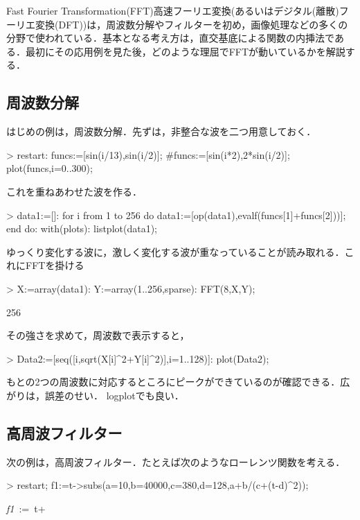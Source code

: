 Fast Fourier Transformation(FFT)高速フーリエ変換(あるいはデジタル(離散)フーリエ変換(DFT))は，周波数分解やフィルターを初め，画像処理などの多くの分野で使われている．基本となる考え方は，直交基底による関数の内挿法である．最初にその応用例を見た後，どのような理屈でFFTが動いているかを解説する．

\subsection{周波数分解}
はじめの例は，周波数分解．先ずは，非整合な波を二つ用意しておく．
\begin{MapleInput}
> restart:
  funcs:=[sin(i/13),sin(i/2)];
  #funcs:=[sin(i*2),2*sin(i/2)];
  plot(funcs,i=0..300);
\end{MapleInput}
これを重ねあわせた波を作る．
\begin{MapleInput}
> data1:=[]:
  for i from 1 to 256 do
    data1:=[op(data1),evalf(funcs[1]+funcs[2]))]; 
  end do:
  with(plots): 
  listplot(data1);
\end{MapleInput}
ゆっくり変化する波に，激しく変化する波が重なっていることが読み取れる．これにFFTを掛ける
\begin{MapleInput}
> X:=array(data1): 
  Y:=array(1..256,sparse):
  FFT(8,X,Y);
\end{MapleInput}
\begin{MapleOutput}
256
\end{MapleOutput}
その強さを求めて，周波数で表示すると，
\begin{MapleInput}
> Data2:=[seq([i,sqrt(X[i]^2+Y[i]^2)],i=1..128)]:
  plot(Data2);
\end{MapleInput}
もとの2つの周波数に対応するところにピークができているのが確認できる．広がりは，誤差のせい．
logplotでも良い．

\subsection{高周波フィルター}
次の例は，高周波フィルター．たとえば次のようなローレンツ関数を考える．
\begin{MapleInput}
> restart;
  f1:=t->subs(a=10,b=40000,c=380,d=128,a+b/(c+(t-d)^2));
\end{MapleInput}
\begin{MapleOutput}
{\it f1}\, := \,t+\displaystyle {}
\end{MapleOutput}

